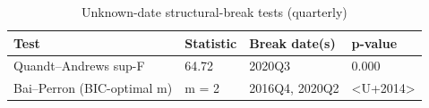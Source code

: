 \begin{table}

\caption{\label{tab:unknown-breaks}Unknown-date structural-break tests (quarterly)}
\centering
\begin{tabular}[t]{llll}
\toprule
Test & Statistic & Break date(s) & p-value\\
\midrule
Quandt--Andrews sup-F & 64.72 & 2020Q3 & 0.000\\
Bai--Perron (BIC-optimal m) & m = 2 & 2016Q4, 2020Q2 & <U+2014>\\
\bottomrule
\end{tabular}
\end{table}
